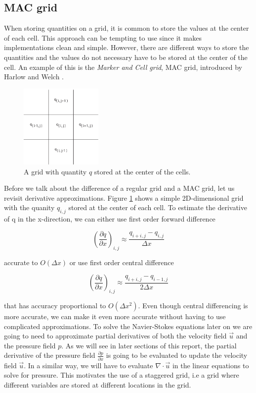 \subsection{MAC grid}

When storing quantities on a grid, it is common to store the values at the center of each cell. This approach can be tempting to use since it makes implementations clean and simple. However, there are different ways to store the quantities and the values do not necessary have to be stored at the center of the cell. An example of this is the \emph{Marker and Cell grid}, MAC grid, introduced by Harlow and Welch \cite{mac}.

\begin{figure}[ht!]
\centering
\includegraphics[width=40mm]{img/mac.pdf}
\caption{A grid with quantity $q$ stored at the center of the cells.}
\label{regulargrid}
\end{figure}
\noindent
Before we talk about the difference of a regular grid and a MAC grid, let us revisit derivative approximations. Figure \ref{regulargrid} shows a simple 2D-dimensional grid with the quanity $q_{i,j}$ stored at the center of each cell. To estimate the derivative of q in the x-direction, we can either use first order forward difference 

\begin{equation}
(\frac{\partial q}{\partial x})_{i,j} \approx \frac{q_{i+i,j} - q_{i,j}}{\Delta x}
\end{equation}

accurate to $O(\Delta x)$ or use first order central difference

\begin{equation}
(\frac{\partial q}{\partial x})_{i,j} \approx \frac{q_{i+i,j} - q_{i-1,j}}{2\Delta x}
\label{centraldifference}
\end{equation}

that has accuracy proportional to $O(\Delta x^{2})$. Even though central differencing is more accurate, we can make it even more accurate without having to use complicated approximations. To solve the Navier-Stokes equations later on we are going to need to approximate partial derivatives of both the velocity field $\vec{u}$ and the pressure field $p$. As we will see in later sections of this report, the partial derivative of the pressure field $\frac{\partial p}{\partial x}$ is going to be evaluated to update the velocity field $\vec{u}$. In a similar way, we will have to evaluate $\nabla \cdot \vec{u}$ in the linear equations to solve for pressure. This motivates the use of a staggered grid, i.e a grid where different variables are stored at different locations in the grid.

